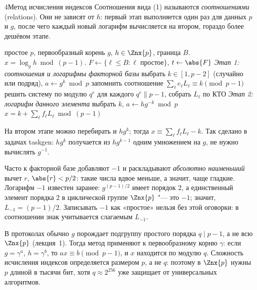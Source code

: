 \begin{lecture}{4}{Метод исчисления индексов}
Соотношения вида (1) называются \emph{соотношениями} (relations). Они не зависят от $h$:
первый этап выполняется один раз для данных $p$ и $g$, после чего каждый новый логарифм
вычисляется на втором, гораздо более дешёвом этапе.

\begin{algorithm}\label{l4:alg}
\begin{algorithmic}[1]
\Require простое $p$, первообразный корень $g$, $h \in \Znx{p}$, граница $B$.
\Ensure $x = \log_g h \bmod (p - 1)$.
\State $F \gets \{\ell \le B : \ell \text{ простое}\}$, $t \gets \abs{F}$
\Statex \textit{Этап 1: соотношения и логарифмы факторной базы}
\Repeat
  \State выбрать $k \in [1, p - 2]$ (случайно или подряд), $a \gets g^k \bmod p$
    \State запомнить соотношение $\sum_\ell e_\ell L_\ell \equiv k \pmod{p - 1}$
  \EndIf
{}
\State решить систему по модулю $q^e$ для каждого $q^e \parallel p - 1$, собрать $L_\ell$ по КТО
\Statex \textit{Этап 2: логарифм данного элемента}
\Repeat
  \State выбрать $k$, $a \gets h g^{-k} \bmod p$
\State \Return $x = k + \sum_\ell f_\ell L_\ell \bmod (p - 1)$
\end{algorithmic}
\end{algorithm}

\begin{remark}
На втором этапе можно перебирать и $h g^{k}$; тогда $x \equiv \sum_\ell f_\ell L_\ell - k$.
Так сделано в задачах taskgen: $h g^{k}$ получается из $h g^{k - 1}$ одним умножением на $g$,
не нужно вычислять $g^{-1}$.
\end{remark}

\begin{remark}\label{l4:minus-one}
Часто к факторной базе добавляют $-1$ и раскладывают \emph{абсолютно наименьший} вычет $r$,
$\abs{r} < p/2$: такие числа вдвое меньше, а значит, чаще гладкие. Логарифм $-1$ известен заранее:
$g^{(p-1)/2}$ имеет порядок $2$, а единственный элемент порядка $2$ в циклической группе
$\Znx{p}$ "--- это $-1$; значит, $L_{-1} = (p - 1)/2$. Записывать $-1$ как «простое» нельзя без
этой оговорки: в соотношении знак учитывается слагаемым $L_{-1}$.
\end{remark}

\begin{remark}
В протоколах обычно $g$ порождает подгруппу простого порядка $q \mid p - 1$, а не всю $\Znx{p}$
(лекция~1). Тогда метод применяют к первообразному корню $\gamma$: если $g = \gamma^{a}$,
$h = \gamma^{b}$, то $a x \equiv b \pmod{p - 1}$, и $x$ находится по модулю $q$. Сложность
исчисления индексов определяется размером $p$, а не $q$: поэтому в $\Znx{p}$ нужны $p$ длиной
в тысячи бит, хотя $q \approx 2^{256}$ уже защищает от универсальных алгоритмов.
\end{remark}


\end{lecture}
